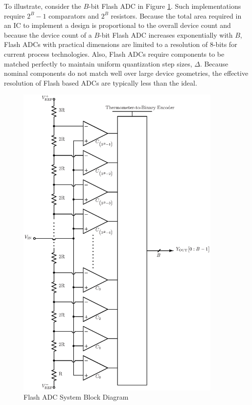 To illustrate, consider the $B$-bit Flash ADC in Figure \ref{fig:flash_adc}. Such
implementations require $2^B-1$ comparators and $2^B$ resistors. Because the total area
required in an IC to implement a design is proportional to the overall device count and
because the device count of a $B$-bit Flash ADC increases exponentially with $B$, Flash
ADCs with practical dimensions are limited to a resolution of 8-bits for current process
technologies\cite{johns_analog_1996}. Also, Flash ADCs require components to be matched
perfectly to maintain uniform quantization step sizes, $\Delta$. Because nominal
components do not match well over large device geometries, the effective resolution of
Flash based ADCs are typically less than the ideal.
\begin{figure}[htbp]
 \centering
 \includegraphics[width=0.9\textwidth]{./final_figures/Flash_ADC.eps}
 \caption{Flash ADC System Block Diagram}
 \label{fig:flash_adc}
\end{figure}

